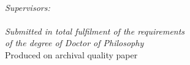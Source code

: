 \begin{titlepage}
\begin{center}
{\LARGE      \myName       }\\
\vspace{1cm}
{\large
\emph{Supervisors:}\\
\mySupervisor \quad \quad \quad \myCoSupervisor
}\\
\vspace{2.5cm}
{\em\large Submitted in total fulfilment of the requirements}\\ \vspace{0.1cm}
{\em\large        of the degree of Doctor of Philosophy     }\\ \vspace{3cm}
{Produced on archival quality paper}\\
\vspace{0.4cm}
{             \myTime        }\\ \vspace{0.5cm}
\end{center}
\end{titlepage}
